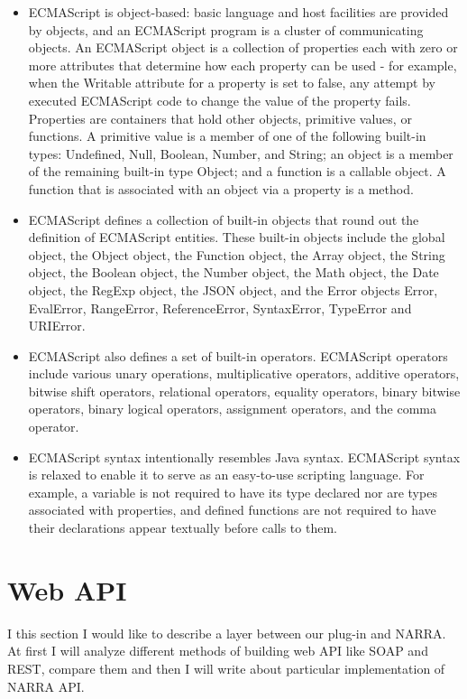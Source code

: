 \documentclass[thesis=B,english]{FITthesis}[2012/10/20]
\begin{document}
	\begin{itemize}
\item ECMAScript is object-based: basic language and host facilities are provided by objects, and an ECMAScript program is a cluster of communicating objects. An ECMAScript object is a collection of properties each with zero or more attributes that determine how each property can be used - for example, when the Writable attribute for a property is set to false, any attempt by executed ECMAScript code to change the value of the property fails. Properties are containers that hold other objects, primitive values, or functions. A primitive value is a member of one of the following built-in types: Undefined, Null, Boolean, Number, and String; an object is a member of the remaining built-in type Object; and a function is a callable object. A function that is associated with an object via a property is a method.
\item ECMAScript defines a collection of built-in objects that round out the definition of ECMAScript entities. These built-in objects include the global object, the Object object, the Function object, the Array object, the String object, the Boolean object, the Number object, the Math object, the Date object, the RegExp object, the JSON object, and the Error objects Error, EvalError, RangeError, ReferenceError, SyntaxError, TypeError and URIError.
\item ECMAScript also defines a set of built-in operators. ECMAScript operators include various unary operations, multiplicative operators, additive operators, bitwise shift operators, relational operators, equality operators, binary bitwise operators, binary logical operators, assignment operators, and the comma operator.
\item ECMAScript syntax intentionally resembles Java syntax. ECMAScript syntax is relaxed to enable it to serve as an easy-to-use scripting language. For example, a variable is not required to have its type declared nor are types associated with properties, and defined functions are not required to have their declarations appear textually before calls to them.\cite{ecma}
	\end{itemize}

\section{Web API}
I this section I would like to describe a layer between our plug-in and NARRA. At first I will analyze different methods of building web API like SOAP and REST, compare them and then I will write about particular implementation of NARRA API.
\end{document}
